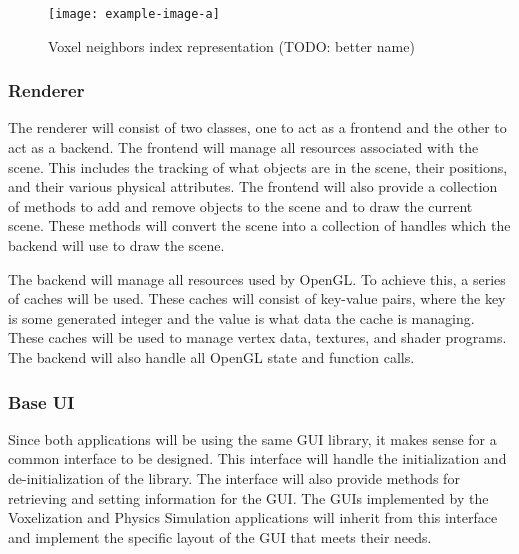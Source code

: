 \begin{figure}[h]
  \centering
  \texttt{[image: example-image-a]}
  \caption{Voxel neighbors index representation (TODO: better name)}
  \label{fig:VoxelNeighbors}
\end{figure}


\subsubsection{Renderer}

The renderer will consist of two classes, one to act as a frontend and the other to act as a
backend. The frontend will manage all resources associated with the scene. This includes the 
tracking of what objects are in the scene, their positions, and their various physical attributes.
The frontend will also provide a collection of methods to add and remove objects to the scene and to 
draw the current scene. These methods will convert the scene into a collection of handles which the
backend will use to draw the scene.

The backend will manage all resources used by OpenGL. To achieve this, a series of caches will be 
used. These caches will consist of key-value pairs, where the key is some generated integer and the
value is what data the cache is managing. These caches will be used to manage vertex data, textures,
and shader programs. The backend will also handle all OpenGL state and function calls.

\subsubsection{Base UI}

Since both applications will be using the same GUI library, it makes sense for a common interface
to be designed. This interface will handle the initialization and de-initialization of the library.
The interface will also provide methods for retrieving and setting information for the GUI. The
GUIs implemented by the Voxelization and Physics Simulation applications will inherit from this
interface and implement the specific layout of the GUI that meets their needs.

